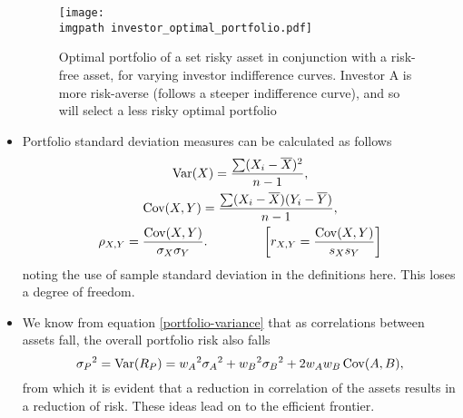 \documentclass[../notes_compiled.tex]{subfiles}
\begin{document}
\begin{itemize}
\begin{figure}[h]
  \centering
  \texttt{[image: \\imgpath investor\_optimal\_portfolio.pdf]}
  \caption{Optimal portfolio of a set risky asset in conjunction with a risk-free asset, for varying investor indifference curves. Investor A is more risk-averse (follows a steeper indifference curve), and so will select a less risky optimal portfolio}
\end{figure}
\item Portfolio standard deviation measures can be calculated as follows
\begin{gather}
\text{Var}(X) = \frac{\sum(X_{i} - \overline{X})^{2}}{n-1}, \\
\text{Cov}(X,Y) = \frac{\sum(X_{i} - \overline{X})(Y_{i} - \overline{Y})}{n-1}, \\
\rho_{X,Y} = \frac{\operatorname{Cov}(X,Y)}{\sigma_{X}\sigma_{Y}}. \hspace{1.5cm} \left[ r_{X,Y}=\frac{\operatorname{Cov}(X,Y)}{s_{X}s_{Y}} \right]
\end{gather}
noting the use of sample standard deviation in the definitions here. This loses a degree of freedom.
\item We know from equation \ref{portfolio-variance} that as correlations between assets fall, the overall portfolio risk also falls
\begin{equation*}
{\sigma_{P}}^{2} = \text{Var}(R_{P}) = {w_{A}}^{2}{\sigma_{A}}^{2} + {w_{B}}^{2}{\sigma_{B}}^{2} + 2w_{A}w_{B}\operatorname{Cov}(A,B), \label{portfolio-variance-2}
\end{equation*}
from which it is evident that a reduction in correlation of the assets results in a reduction of risk. These ideas lead on to the efficient frontier.
\end{itemize}
\end{document}
